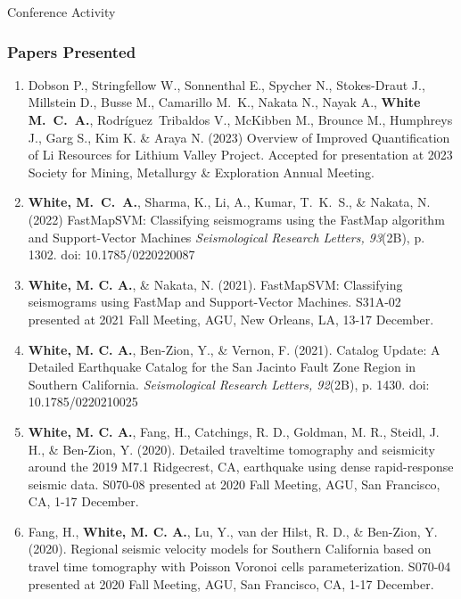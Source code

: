 \begin{rSection}{Conference Activity}
	\subsubsection*{Papers Presented}
		\begin{enumerate}
			\item Dobson P., Stringfellow W., Sonnenthal E., Spycher N., Stokes-Draut J., Millstein D., Busse M., Camarillo M.~K., Nakata N., Nayak A., \textbf{White M.~C.~A.}, Rodríguez~Tribaldos V., McKibben M., Brounce M., Humphreys J., Garg S., Kim K. \& Araya N. (2023) Overview of Improved Quantification of Li Resources for Lithium Valley Project. Accepted for presentation at 2023 Society for Mining, Metallurgy \& Exploration Annual Meeting.
			
			\item \textbf{White, M.~C.~A.}, Sharma, K., Li, A., Kumar, T.~K.~S., \& Nakata, N. (2022) FastMapSVM: Classifying seismograms using the FastMap algorithm and Support-Vector Machines \textit{Seismological Research Letters, 93}(2B), p. 1302. doi: 10.1785/0220220087
				
			\item \textbf{White, M. C. A.},  \& Nakata, N. (2021). FastMapSVM: Classifying seismograms using FastMap and Support-Vector Machines. S31A-02 presented at 2021 Fall Meeting, AGU, New Orleans, LA, 13-17 December.
	
			\item \textbf{White, M. C. A.}, Ben-Zion, Y., \& Vernon, F. (2021). Catalog Update: A Detailed Earthquake Catalog for the San Jacinto Fault Zone Region in Southern California.  \textit{Seismological Research Letters, 92}(2B), p. 1430. doi: 10.1785/0220210025
	
			\item \textbf{White, M. C. A.}, Fang, H., Catchings, R. D., Goldman, M. R., Steidl, J. H., \& Ben-Zion, Y. (2020). Detailed traveltime tomography and seismicity around the 2019 M7.1 Ridgecrest, CA, earthquake using dense rapid-response seismic data. S070-08 presented at 2020 Fall Meeting, AGU, San Francisco, CA, 1-17 December.
	
			\item Fang, H., \textbf{White, M. C. A.}, Lu, Y., van der Hilst, R. D., \& Ben-Zion, Y. (2020). Regional seismic velocity models for Southern California based on travel time tomography with Poisson Voronoi cells parameterization.  S070-04 presented at 2020 Fall Meeting, AGU, San Francisco, CA, 1-17 December.
			

\end{enumerate}
\end{rSection}
